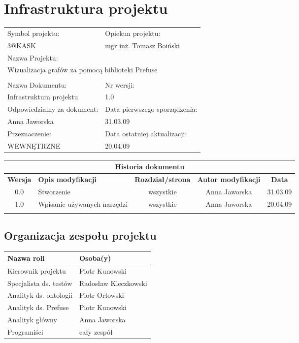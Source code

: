 







\section{Infrastruktura projektu}



\begin{center}
\begin{tabular}{|p{7cm}|p{7cm}|}
\hline
Symbol projektu: & Opiekun projektu:   \tabularnewline 
3@KASK & mgr inż. Tomasz Boiński    \tabularnewline \hline
\multicolumn{2}{|l|}{Nazwa Projektu: } \tabularnewline
\multicolumn{2}{|l|}{Wizualizacja grafów za pomocą biblioteki Prefuse } \tabularnewline 
\hline
\multicolumn{2}{l}{ } \tabularnewline %
\hline 
Nazwa Dokumentu: & Nr wersji:   \tabularnewline 
Infrastruktura projektu & 1.0 \tabularnewline \hline
Odpowiedzialny za dokument: & Data pierwszego sporządzenia:   \tabularnewline 
Anna Jaworska  & 31.03.09 \tabularnewline \hline
Przeznaczenie: & Data ostatniej aktualizacji:   \tabularnewline 
WEWNĘTRZNE & 20.04.09 \tabularnewline \hline
\end{tabular}
\end{center}

\begin{center}
\begin{tabular}{|c|p{4cm}|c|c|c|}
\multicolumn{5}{c}{\textbf{Historia dokumentu}} \tabularnewline \hline
\textbf{Wersja} & \textbf{Opis modyfikacji} & \textbf{Rozdział/strona} & \textbf{Autor modyfikacji} & \textbf{Data} \tabularnewline \hline 
0.0 & Stworzenie & wszystkie & Anna Jaworska & 31.03.09 \tabularnewline \hline
1.0 & Wpisanie używanych narzędzi & wszystkie & Anna Jaworska & 20.04.09 \tabularnewline \hline
& & & &\tabularnewline \hline
\end{tabular}
 

\end{center}


\newpage


\subsection{Organizacja zespołu projektu}
\begin{center}
\begin{tabular}{|l|l|} \hline
	Nazwa roli & Osoba(y) \tabularnewline \hline
	Kierownik projektu & Piotr Kunowski \tabularnewline \hline
	Specjalista ds. testów & Radosław Kleczkowski \tabularnewline \hline
	Analityk ds. ontologii & Piotr Orłowski \tabularnewline \hline
	Analityk ds. Prefuse & Piotr Kunowski \tabularnewline \hline
	Analityk główny & Anna Jaworska \tabularnewline \hline
	Programiści & cały zespół \tabularnewline \hline
\end{tabular}
\end{center}

